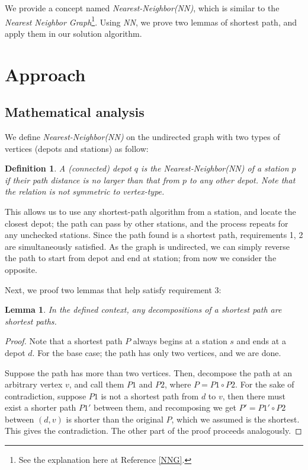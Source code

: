 \documentclass[12pt]{article}  %
\newtheorem{definition}{Definition}
\newtheorem{lemma}{Lemma}
\begin{document}
We provide a concept named \emph{Nearest-Neighbor(NN)}, which is similar to the \emph{Nearest Neighbor Graph}\footnote{See the explanation here at Reference \ref{NNG}.}. Using \emph{NN}, we prove two lemmas of shortest path, and apply them in our solution algorithm.




\section{Approach}

\subsection{Mathematical analysis}

We define \emph{Nearest-Neighbor(NN)} on the undirected graph with two types of vertices (depots and stations) as follow: 
\begin{definition}\label{defNN}
A (connected) depot $q$ is the Nearest-Neighbor(NN) of a station $p$ if their path distance is no larger than that from $p$ to any other depot. Note that the relation is not symmetric to vertex-type.
\end{definition}

This allows us to use any shortest-path algorithm from a station, and locate the closest depot; the path can pass by other stations, and the process repeats for any unchecked stations. Since the path found is a shortest path, requirements 1, 2 are simultaneously satisfied. As the graph is undirected, we can simply reverse the path to start from depot and end at station; from now we consider the opposite.

Next, we proof two lemmas that help satisfy requirement 3:

\begin{lemma}\label{decom}
In the defined context, any decompositions of a shortest path are shortest paths.
\end{lemma}
\begin{proof}
Note that a shortest path $P$ always begins at a station $s$ and ends at a depot $d$. For the base case; the path has only two vertices, and we are done.

Suppose the path has more than two vertices. Then, decompose the path at an arbitrary vertex $v$, and call them $P1$ and $P2$, where $P = P1 \circ P2$. For the sake of contradiction, suppose $P1$ is not a shortest path from $d$ to $v$, then there must exist a shorter path $P1'$ between them, and recomposing we get $P' = P1' \circ P2$ between $(d, v)$ is shorter than the original $P$, which we assumed is the shortest. This gives the contradiction. The other part of the proof proceeds analogously.
\end{proof}
\end{document}
